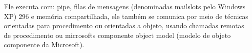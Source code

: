 \documentclass[
	12pt,				%
	oneside,   	        %
	a4paper,			%
	english,			%
	french,				%
	spanish,			%
	brazil,				%
	]{pacotes/abntex2}
\begin{document}
Ele executa com: pipe, filas de mensagens (denominadas mailslots pelo Windows XP) 296 e memória compartilhada, ele também se comunica por meio de técnicas orientadas para procedimento ou orientadas a objeto, usando chamadas remotas de procedimento ou microsofts componente object model (modelo de objeto componente da Microsoft).

\newpage
\postextual
\renewcommand{\bibsection}{%
\section{\bibname}
\bibmark
\prebibhook}










\end{document}
